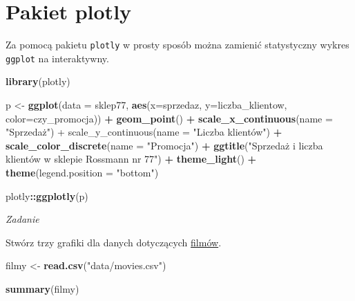 \documentclass[]{book}
\newenvironment{Shaded}{\begin{snugshade}}{\end{snugshade}}
\newcommand{\KeywordTok}[1]{\textcolor[rgb]{0.13,0.29,0.53}{\textbf{#1}}}
\newcommand{\DataTypeTok}[1]{\textcolor[rgb]{0.13,0.29,0.53}{#1}}
\newcommand{\StringTok}[1]{\textcolor[rgb]{0.31,0.60,0.02}{#1}}
\newcommand{\OperatorTok}[1]{\textcolor[rgb]{0.81,0.36,0.00}{\textbf{#1}}}
\newcommand{\NormalTok}[1]{#1}
\begin{document}
\section{Pakiet plotly}\label{pakiet-plotly}

Za pomocą pakietu \texttt{plotly} w prosty sposób można zamienić
statystyczny wykres \texttt{ggplot} na interaktywny.

\begin{Shaded}
\begin{Highlighting}[]
\KeywordTok{library}\NormalTok{(plotly)}

\NormalTok{p <-}\StringTok{ }\KeywordTok{ggplot}\NormalTok{(}\DataTypeTok{data =}\NormalTok{ sklep77, }\KeywordTok{aes}\NormalTok{(}\DataTypeTok{x=}\NormalTok{sprzedaz, }\DataTypeTok{y=}\NormalTok{liczba_klientow, }\DataTypeTok{color=}\NormalTok{czy_promocja)) }\OperatorTok{+}
\StringTok{  }\KeywordTok{geom_point}\NormalTok{() }\OperatorTok{+}
\StringTok{  }\KeywordTok{scale_x_continuous}\NormalTok{(}\DataTypeTok{name =} \StringTok{"Sprzedaż") +}
\StringTok{  scale_y_continuous(name = "}\NormalTok{Liczba klientów") }\OperatorTok{+}
\StringTok{  }\KeywordTok{scale_color_discrete}\NormalTok{(}\DataTypeTok{name =} \StringTok{"Promocja"}\NormalTok{) }\OperatorTok{+}
\StringTok{  }\KeywordTok{ggtitle}\NormalTok{(}\StringTok{"Sprzedaż i liczba klientów w sklepie Rossmann nr 77"}\NormalTok{) }\OperatorTok{+}
\StringTok{  }\KeywordTok{theme_light}\NormalTok{() }\OperatorTok{+}
\StringTok{  }\KeywordTok{theme}\NormalTok{(}\DataTypeTok{legend.position =} \StringTok{"bottom"}\NormalTok{)}

\NormalTok{plotly}\OperatorTok{::}\KeywordTok{ggplotly}\NormalTok{(p)}
\end{Highlighting}
\end{Shaded}

\emph{Zadanie}

Stwórz trzy grafiki dla danych dotyczących
\href{data/movies.csv}{filmów}.

\begin{Shaded}
\begin{Highlighting}[]
\NormalTok{filmy <-}\StringTok{ }\KeywordTok{read.csv}\NormalTok{(}\StringTok{"data/movies.csv"}\NormalTok{)}

\KeywordTok{summary}\NormalTok{(filmy)}
\end{Highlighting}
\end{Shaded}
\end{document}
